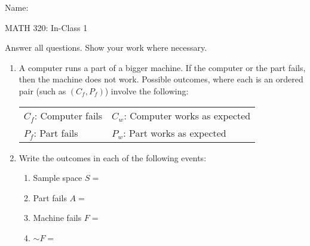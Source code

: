 \documentclass{article}
\newcommand{\comp}{{\sim}}			%
\begin{document}
\hspace{375pt}Name:

\begin{center}
{\Huge MATH 320: In-Class 1}
\end{center}

\bigskip\bigskip



Answer all questions. Show your work where necessary.\bigskip

\begin{enumerate}
    \item A computer runs a part of a bigger machine. If the computer or the part fails, then the machine does not work. Possible outcomes, where each is an ordered pair (such as $(C_f, P_f)$) involve the following:\\%
    \begin{center}
        \begin{tabular}{l l}
        $C_f$: Computer fails & $C_w$: Computer works as expected\\
        $P_f$: Part fails & $P_w$: Part works as expected\\
        \end{tabular}
    \end{center}
    \item[] Write the outcomes in each of the following events:
    \begin{enumerate}
        \item Sample space $S = $ \\
        \item Part fails $A = $\\
        \item Machine fails $F = $ \\
        \item $\comp{F} = $
    \end{enumerate}\vspace{20pt}
    

\end{enumerate}
\end{document}
